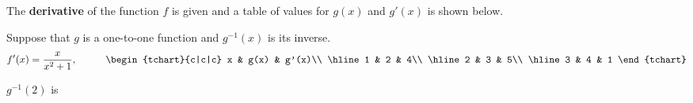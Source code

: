 \documentclass{ximera}
\author{Gregory Hartman \and Matthew Carr}
\begin{document}
\begin{exercise}



The \textbf{derivative} of the function $f$ is given and a table of values for $g(x)$ and $g'(x)$ is shown below.

Suppose that $g$ is a one-to-one function and $g^{-1}(x)$ is its inverse.
\[
f'(x)=\frac{x}{x^2+1},\hskip 1cm
\begin{tchart}{c|c|c}
x & g(x) & g'(x)\\ \hline
1 & 2 & 4\\ \hline
2 & 3 & 5\\ \hline
3 & 4 & 1
\end{tchart}
\]

$g^{-1}(2)$ is
\begin{prompt}
\begin{multipleChoice}
\end{multipleChoice}
\end{prompt}

\end{exercise}
\end{document}
